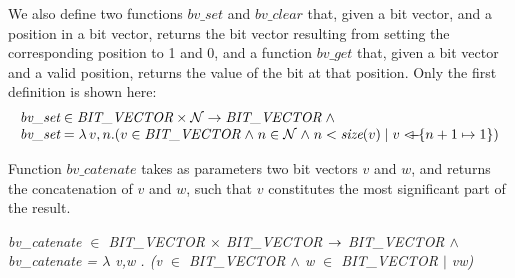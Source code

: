 \documentclass[a4paper]{llncs}
\begin{document}
We also define two functions $\textit{bv\_set}$ and
$\textit{bv\_clear}$ that, given a bit vector, and a position in a
bit vector, returns the bit vector resulting from setting the
corresponding position to 1 and 0, and a function $\textit{bv\_get}$
that, given a bit vector and a valid position, returns the value of
the bit at that position. Only the first definition is shown here:
$$
\begin{array}{l}
\textit{bv\_set} \in \textit{BIT\_VECTOR} \times \nat \fun \textit{BIT\_VECTOR} \land \\ \textit{bv\_set} =
\lambda v, n . (v \in \textit{BIT\_VECTOR} \land n \in \nat \land n <\textit{size}(v)
\mid v \lover \{ n+1 \mapsto 1 \})
\end{array}
$$

Function $bv\_catenate$ takes as parameters two bit vectors $v$ and
$w$, and returns the concatenation of $v$ and $w$, such
that $v$ constitutes the most significant part of the result.

%
\begin{flushleft}
\hspace*{0.0in}\it bv\_catenate  $\in$  \it BIT\_VECTOR  $\times$  \it BIT\_VECTOR  $\rightarrow$ \it
BIT\_VECTOR $\land$\\
\it bv\_catenate \rm =  $\lambda$  v\rm ,\it w \rm . \rm (\it v 
$\in$  \it BIT\_VECTOR $\land$ \it w $\in$  \it BIT\_VECTOR  $\mid$  \it v\^ \it w\rm ) %
\\

\end{flushleft}


%
%
\end{document}
